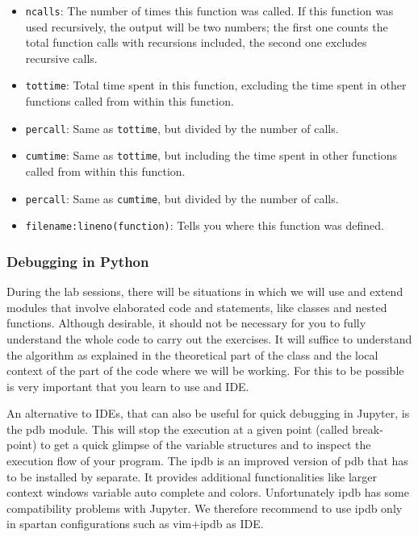 \begin{itemize}
\item \texttt{ncalls}: The number of times this function was called. If this function was used recursively, the output will be two numbers; the first one counts the total function calls with recursions included, the second one excludes recursive calls.
\item \texttt{tottime}: Total time spent in this function, excluding the time spent in other functions called from within this function.
\item \texttt{percall}: Same as \texttt{tottime}, but divided by the number of calls.
\item \texttt{cumtime}: Same as \texttt{tottime}, but including the time spent in other functions called from within this function.
\item \texttt{percall}: Same as \texttt{cumtime}, but divided by the number of calls.
\item \texttt{filename:lineno(function)}: Tells you where this function was defined.
\end{itemize}

\subsubsection{Debugging in Python}

During the lab sessions, there will be situations in which we will use and extend modules that involve elaborated code and statements, like classes and nested functions. Although desirable, it should not be necessary for you to fully understand the whole code to carry out the exercises. It will suffice to understand the algorithm as explained in the theoretical part of the class and the local context of the part of the code where we will be working. For this to be possible is very important that you learn to use and IDE. 

An alternative to IDEs, that can also be useful for quick debugging in Jupyter, is the pdb module. This will stop the execution at a given point (called break-point) to get a quick glimpse of the variable structures and to inspect the execution flow of your program. The ipdb is an improved version of pdb that has to be installed by separate. It provides additional functionalities like larger context windows variable auto complete and colors. Unfortunately ipdb has some compatibility problems with Jupyter. We therefore recommend to use ipdb only in spartan configurations such as vim+ipdb as IDE.

